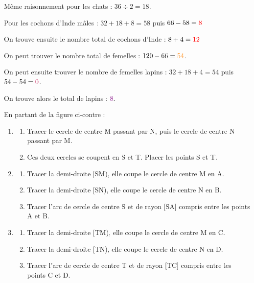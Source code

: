 \documentclass[a4paper]{book}
\begin{document}
{\begin{exercice}
        Même raisonnement pour les chats : $36\div2=18$.

        Pour les cochons d'Inde mâles : $32+18+8=58$ puis $66-58=\textcolor{red}{8}$

        On trouve ensuite le nombre total de cochons d'Inde : $8+4=\textcolor{red}{12}$

        On peut trouver le nombre total de femelles : $120-66=\textcolor{orange}{54}$.

        On peut ensuite trouver le nombre de femelles lapins : $32+18+4=54$ puis $54-54=\textcolor{purple}{0}$.

        On trouve alors le total de lapins : \textcolor{purple}{8}.
    \end{exercice}

        
    \begin{exercice}
        En partant de la figure ci-contre : 
        
        \begin{minipage}{0.5\linewidth}
            \begin{enumerate}[leftmargin=*, itemsep=0.5cm]
                \item
                \begin{enumerate}[label=\textbf{\alph*.}, leftmargin=*, itemsep=0.3cm]
                    \item Tracer le cercle de centre M passant par N, puis le cercle de centre N passant par M.
                    \item Ces deux cercles se coupent en S et T. Placer les points S et T.
                \end{enumerate}
            
                \item
                \begin{enumerate}[label=\textbf{\alph*.}, leftmargin=*, itemsep=0.3cm]
                    \item Tracer la demi-droite [SM), elle coupe le cercle de centre M en A.
                    \item Tracer la demi-droite [SN), elle coupe le cercle de centre N en B.
                    \item Tracer l'arc de cercle de centre S et de rayon [SA] compris entre les points A et B.
                \end{enumerate}
            
                \item
                \begin{enumerate}[label=\textbf{\alph*.}, leftmargin=*, itemsep=0.3cm]
                    \item Tracer la demi-droite [TM), elle coupe le cercle de centre M en C.
                    \item Tracer la demi-droite [TN), elle coupe le cercle de centre N en D.
                    \item Tracer l'arc de cercle de centre T et de rayon [TC] compris entre les points C et D.
                \end{enumerate}
            \end{enumerate}
    

\end{minipage}
\end{exercice}}
\end{document}
